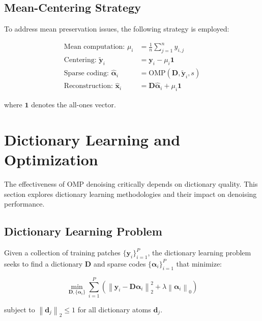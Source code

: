 \documentclass[12pt]{article}
\renewcommand{\vec}[1]{\mathbf{#1}}
\newcommand{\norm}[1]{\left\|#1\right\|}
\theoremstyle{definition}
\begin{document}
\subsection{Mean-Centering Strategy}
\label{subsec:mean_centering}

To address mean preservation issues, the following strategy is employed:

\begin{align}
    \text{Mean computation: } \mu_i             & = \frac{1}{n} \sum_{j=1}^n y_{i,j}                \\
    \text{Centering: } \tilde{\vec{y}}_i        & = \vec{y}_i - \mu_i \vec{1}                       \\
    \text{Sparse coding: } \hat{\vec{\alpha}}_i & = \text{OMP}(\mathbf{D}, \tilde{\vec{y}}_i, s)    \\
    \text{Reconstruction: } \hat{\vec{x}}_i     & = \mathbf{D} \hat{\vec{\alpha}}_i + \mu_i \vec{1}
\end{align}

where $\vec{1}$ denotes the all-ones vector.

\newpage

\section{Dictionary Learning and Optimization}
\label{sec:dictionary_learning}

The effectiveness of OMP denoising critically depends on dictionary quality. This section explores dictionary learning methodologies and their impact on denoising performance.

\subsection{Dictionary Learning Problem}
\label{subsec:dict_learning_problem}

Given a collection of training patches $\{\vec{y}_i\}_{i=1}^P$, the dictionary learning problem seeks to find a dictionary $\mathbf{D}$ and sparse codes $\{\vec{\alpha}_i\}_{i=1}^P$ that minimize:

\begin{equation}
    \min_{\mathbf{D}, \{\vec{\alpha}_i\}} \sum_{i=1}^P \left( \norm{\vec{y}_i - \mathbf{D}\vec{\alpha}_i}_2^2 + \lambda \norm{\vec{\alpha}_i}_0 \right)
\end{equation}

subject to $\norm{\vec{d}_j}_2 \leq 1$ for all dictionary atoms $\vec{d}_j$.
\end{document}
